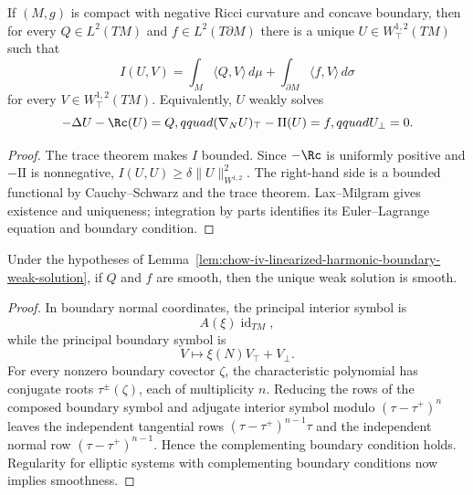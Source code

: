\begin{lemma}
\label{lem:chow-iv-linearized-harmonic-boundary-weak-solution}
If \((M,g)\) is compact with negative Ricci curvature and concave boundary,
then for every \(Q\in L^2(TM)\) and \(f\in L^2(T\partial M)\) there is a unique
\(U\in W^{1,2}_{\top}(TM)\) such that
\[
 I(U,V)=\int_M\langle Q,V\rangle\,d\mu
       +\int_{\partial M}\langle f,V\rangle\,d\sigma
\]
for every \(V\in W^{1,2}_{\top}(TM)\).  Equivalently, \(U\) weakly solves
\[
 -\Delta U-\Rc(U)=Q,qquad
 (\nabla_NU)_{\top}-\mathrm{II}(U)=f,qquad U_\perp=0.
\]
\end{lemma}
\begin{proof}
\sketch
The trace theorem makes \(I\) bounded.  Since \(-\Rc\) is uniformly positive
and \(-\mathrm{II}\) is nonnegative, \(I(U,U)\ge\delta\|U\|_{W^{1,2}}^2\).
The right-hand side is a bounded functional by Cauchy--Schwarz and the trace
theorem.  Lax--Milgram gives existence and uniqueness; integration by parts
identifies its Euler--Lagrange equation and boundary condition.
\end{proof}

\begin{lemma}
\label{lem:chow-iv-linearized-harmonic-boundary-regularity}
Under the hypotheses of Lemma~\ref{lem:chow-iv-linearized-harmonic-boundary-weak-solution},
if \(Q\) and \(f\) are smooth, then the unique weak solution is smooth.
\end{lemma}
\begin{proof}
\sketch
In boundary normal coordinates, the principal interior symbol is
\[
 A(\xi)\operatorname{id}_{TM},
\]
while the principal boundary symbol is
\[
 V\longmapsto \xi(N)V_{\top}+V_\perp.
\]
For every nonzero boundary covector \(\zeta\), the characteristic polynomial
has conjugate roots \(\tau^\pm(\zeta)\), each of multiplicity \(n\).  Reducing
the rows of the composed boundary symbol and adjugate interior symbol modulo
\((\tau-\tau^+)^n\) leaves the independent tangential rows
\((\tau-\tau^+)^{n-1}\tau\) and the independent normal row
\((\tau-\tau^+)^{n-1}\).  Hence the complementing boundary condition holds.
Regularity for elliptic systems with complementing boundary conditions now
implies smoothness.
\end{proof}

